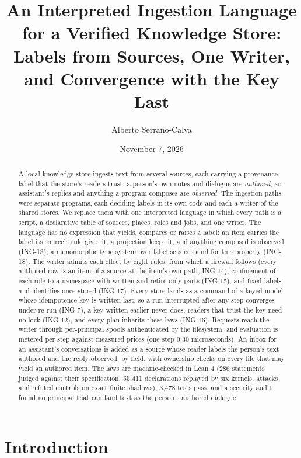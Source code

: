 \documentclass[11pt]{article}
\title{An Interpreted Ingestion Language for a Verified Knowledge Store:\\
Labels from Sources, One Writer, and Convergence with the Key Last}
\author{Alberto Serrano-Calva}
\date{November 7, 2026}
\theoremstyle{plain}
\theoremstyle{definition}
\theoremstyle{remark}
\newcommand{\ing}[1]{ING-#1}
\begin{document}
\maketitle

\begin{abstract}
A local knowledge store ingests text from several sources, each carrying a provenance label
that the store's readers trust: a person's own notes and dialogue are \emph{authored}, an
assistant's replies and anything a program composes are \emph{observed}. The ingestion paths
were separate programs, each deciding labels in its own code and each a writer of the shared
stores. We replace them with one interpreted language in which every path is a script, a
declarative table of sources, places, roles and jobs, and one writer. The language has no
expression that yields, compares or raises a label: an item carries the label its source's rule
gives it, a projection keeps it, and anything composed is observed (\ing{13}); a monomorphic
type system over label sets is sound for this property (\ing{18}). The writer admits each
effect by eight rules, from which a firewall follows (every authored row is an item of a source
at the item's own path, \ing{14}), confinement of each role to a namespace with written and
retire-only parts (\ing{15}), and fixed labels and identities once stored (\ing{17}). Every
store lands as a command of a keyed model whose idempotence key is written last, so a run
interrupted after any step converges under re-run (\ing{7}), a key written earlier never does,
readers that trust the key need no lock (\ing{12}), and every plan inherits these laws
(\ing{16}). Requests reach the writer through per-principal spools authenticated by the
filesystem, and evaluation is metered per step against measured prices (one step 0.30
microseconds). An inbox for an assistant's conversations is added as a source whose reader
labels the person's text authored and the reply observed, by field, with ownership checks on
every file that may yield an authored item. The laws are machine-checked in Lean 4 (286
statements judged against their specification, 55,411 declarations replayed by six kernels,
attacks and refuted controls on exact finite shadows), 3,478 tests pass, and a security audit
found no principal that can land text as the person's authored dialogue.
\end{abstract}

\section{Introduction}
\end{document}
